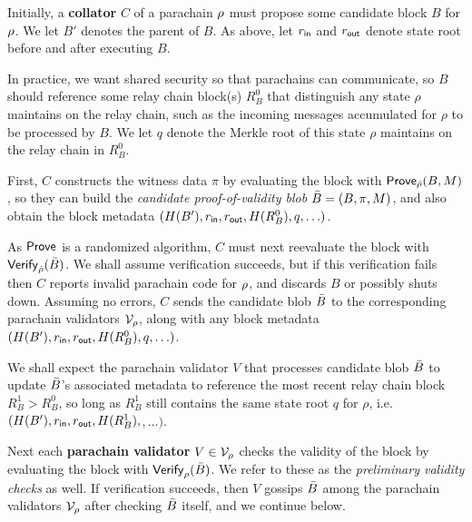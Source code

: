 \smallskip

Initially, a {\bf collator} $C$ of a parachain $\rho$ must propose some candidate block $B$ for $\rho$.  We let $B'$ denotes the parent of $B$.  As above, let $r_{\mathsf{in}}$ and $r_{\mathsf{out}}$ denote state root before and after executing $B$.  

In practice, we want shared security so that parachains can communicate, so $B$ should reference some relay chain block(s) $R^0_B$ that distinguish any state $\rho$ maintains on the relay chain, such as the incoming messages accumulated for $\rho$ to be processed by $B$.  We let $q$ denote the Merkle root of this state $\rho$ maintains on the relay chain in $R^0_B$.
 
First, $C$ constructs the witness data $\pi$ by evaluating the block with $\mathsf{Prove}_{\hat{\rho}}(B,M)$, so they can build the {\em candidate proof-of-validity blob} $\bar{B} = (B,\pi,M)$, and also obtain the block metadata $(H(B'),r_{\mathsf{in}},r_{\mathsf{out}},H(R^0_B),q,\ldots)$. 

As $\mathsf{Prove}$ is a randomized algorithm, $C$ must next reevaluate the block with $\mathsf{Verify}_{\hat{\rho}}(\bar{B})$.  We shall assume verification succeeds, but if this verification fails then $C$ reports invalid parachain code for $\rho$, and discards $B$ or possibly shuts down.  Assuming no errors, $C$ sends the candidate blob $\bar{B}$ to the corresponding parachain validators $\mathcal{V}_{\rho}$, along with any block metadata $(H(B'),r_{\mathsf{in}},r_{\mathsf{out}},H(R^0_B),q,\ldots)$. 

\smallskip

We shall expect the parachain validator $V$ that processes candidate blob $\bar{B}$ to update $\bar{B}$'s associated metadata to reference the most recent relay chain block $R^1_B > R^0_B$, so long as $R^1_B$ still contains the same state root $q$ for $\rho$,
i.e.\ $(H(B'),r_{\mathsf{in}},r_{\mathsf{out}},H(R^1_B),$$,\ldots)$.

Next each {\bf parachain validator} $V \in \mathcal{V}_{\rho}$ checks the validity of the block by evaluating the block with $\mathsf{Verify}_{\rho}(\bar{B})$.  We refer to these as the {\em preliminary validity checks} as well.  If verification succeeds, then $V$ gossips $\bar{B}$ among the parachain validators $\mathcal{V}_{\rho}$ after checking $\bar{B}$ itself, and we continue below.

